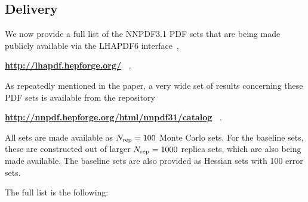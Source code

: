 \subsection{Delivery}
\label{sec:delivery}

We now  provide a full list of the NNPDF3.1 PDF sets that are being 
made publicly available via the {\sc\small LHAPDF6}
interface~\cite{Buckley:2014ana}, 
\begin{center}
{\bf \url{http://lhapdf.hepforge.org/}~} .
\end{center}
As repeatedly mentioned in the paper, a very wide  set of results
concerning these PDF sets is available from the repository
\begin{center}
{\bf \url{http://nnpdf.hepforge.org/html/nnpdf31/catalog}~} .
\end{center}
All sets are made available as  $N_{\rm rep}=100$ Monte Carlo sets. 
For the baseline
sets, these are constructed out of larger  $N_{\rm rep}=1000$ replica
sets, which are also being made available. The baseline sets are also
provided as Hessian sets with 100 error sets.

The full list is the following:

